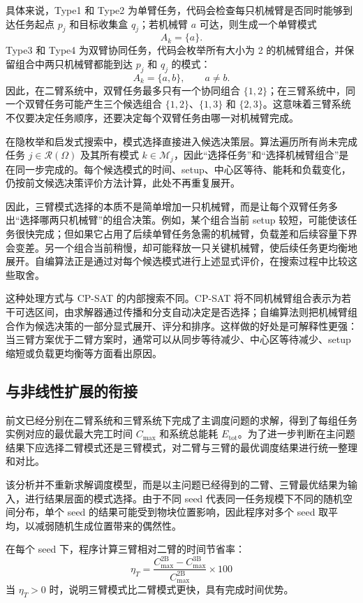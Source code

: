 具体来说，Type1 和 Type2 为单臂任务，代码会检查每只机械臂是否同时能够到达任务起点 $p_j$ 和目标收集盒 $q_j$；若机械臂 $a$ 可达，则生成一个单臂模式
\[
    A_k=\{a\}.
\]
Type3 和 Type4 为双臂协同任务，代码会枚举所有大小为 2 的机械臂组合，并保留组合中两只机械臂都能到达 $p_j$ 和 $q_j$ 的模式：
\[
    A_k=\{a,b\},\qquad a\ne b .
\]
因此，在二臂系统中，双臂任务最多只有一个协同组合 $\{1,2\}$；在三臂系统中，同一个双臂任务可能产生三个候选组合 $\{1,2\}$、$\{1,3\}$ 和 $\{2,3\}$。这意味着三臂系统不仅要决定任务顺序，还要决定每个双臂任务由哪一对机械臂完成。

在隐枚举和启发式搜索中，模式选择直接进入候选决策层。算法遍历所有尚未完成任务 $j\in\mathcal{R}(\Omega)$ 及其所有模式 $k\in\mathcal{M}_j$，因此“选择任务”和“选择机械臂组合”是在同一步完成的。每个候选模式的时间、setup、中心区等待、能耗和负载变化，仍按前文候选决策评价方法计算，此处不再重复展开。

因此，三臂模式选择的本质不是简单增加一只机械臂，而是让每个双臂任务多出“选择哪两只机械臂”的组合决策。例如，某个组合当前 setup 较短，可能使该任务很快完成；但如果它占用了后续单臂任务急需的机械臂，负载差和后续容量下界会变差。另一个组合当前稍慢，却可能释放一只关键机械臂，使后续任务更均衡地展开。自编算法正是通过对每个候选模式进行上述显式评价，在搜索过程中比较这些取舍。

这种处理方式与 CP-SAT 的内部搜索不同。CP-SAT 将不同机械臂组合表示为若干可选区间，由求解器通过传播和分支自动决定是否选择；自编算法则把机械臂组合作为候选决策的一部分显式展开、评分和排序。这样做的好处是可解释性更强：当三臂方案优于二臂方案时，通常可以从同步等待减少、中心区等待减少、setup 缩短或负载更均衡等方面看出原因。

\subsection{与非线性扩展的衔接}

前文已经分别在二臂系统和三臂系统下完成了主调度问题的求解，得到了每组任务实例对应的最优最大完工时间 $C_{\max}$ 和系统总能耗 $E_{\mathrm{tot}}$。为了进一步判断在主问题结果下应选择二臂模式还是三臂模式，对二臂与三臂的最优调度结果进行统一整理和对比。

该分析并不重新求解调度模型，而是以主问题已经得到的二臂、三臂最优结果为输入，进行结果层面的模式选择。由于不同 seed 代表同一任务规模下不同的随机空间分布，单个 seed 的结果可能受到物块位置影响，因此程序对多个 seed 取平均，以减弱随机生成位置带来的偶然性。

在每个 seed 下，程序计算三臂相对二臂的时间节省率：
\[
	\eta_T
	=
	\frac{C_{\max}^{\mathrm{2B}}-C_{\max}^{\mathrm{3B}}}
	{C_{\max}^{\mathrm{2B}}}
	\times 100%
\]
当 $\eta_T>0$ 时，说明三臂模式比二臂模式更快，具有完成时间优势。

